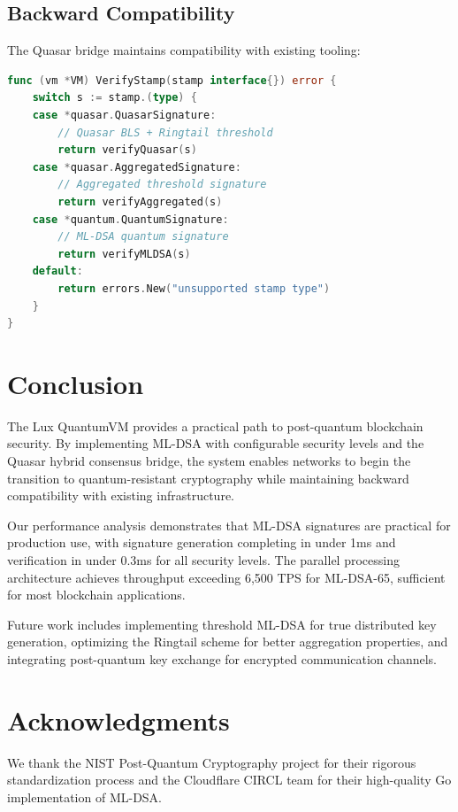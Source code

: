 \documentclass[11pt,a4paper]{article}
\begin{document}
\subsection{Backward Compatibility}

The Quasar bridge maintains compatibility with existing tooling:

\begin{lstlisting}[language=Go,caption={Stamp Verification Interface}]
func (vm *VM) VerifyStamp(stamp interface{}) error {
    switch s := stamp.(type) {
    case *quasar.QuasarSignature:
        // Quasar BLS + Ringtail threshold
        return verifyQuasar(s)
    case *quasar.AggregatedSignature:
        // Aggregated threshold signature
        return verifyAggregated(s)
    case *quantum.QuantumSignature:
        // ML-DSA quantum signature
        return verifyMLDSA(s)
    default:
        return errors.New("unsupported stamp type")
    }
}
\end{lstlisting}

\section{Conclusion}

The Lux QuantumVM provides a practical path to post-quantum blockchain security. By implementing ML-DSA with configurable security levels and the Quasar hybrid consensus bridge, the system enables networks to begin the transition to quantum-resistant cryptography while maintaining backward compatibility with existing infrastructure.

Our performance analysis demonstrates that ML-DSA signatures are practical for production use, with signature generation completing in under 1ms and verification in under 0.3ms for all security levels. The parallel processing architecture achieves throughput exceeding 6,500 TPS for ML-DSA-65, sufficient for most blockchain applications.

Future work includes implementing threshold ML-DSA for true distributed key generation, optimizing the Ringtail scheme for better aggregation properties, and integrating post-quantum key exchange for encrypted communication channels.

\section*{Acknowledgments}

We thank the NIST Post-Quantum Cryptography project for their rigorous standardization process and the Cloudflare CIRCL team for their high-quality Go implementation of ML-DSA.
\end{document}
